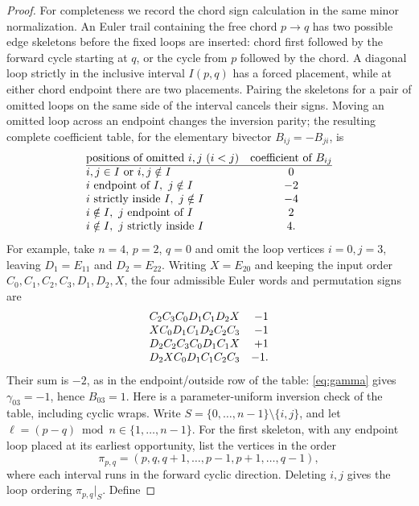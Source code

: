 \begin{proof}
For completeness we record the chord sign calculation in the same
minor normalization. An Euler trail containing the free chord
$p\to q$ has two possible edge skeletons before the fixed loops
are inserted: chord first followed by the forward cycle starting
at $q$, or the cycle from $p$ followed by the chord. A diagonal
loop strictly in the inclusive interval $I(p,q)$ has a forced
placement, while at either chord endpoint there are two placements.
Pairing the skeletons for a pair of omitted loops on the same side
of the interval cancels their signs. Moving an omitted loop
across an endpoint changes the inversion parity; the resulting
complete coefficient table, for the elementary bivector
$B_{ij}=-B_{ji}$, is
\begin{equation}\label{eq:chordsigns}
\begin{array}{@{}lc@{}}
\text{positions of omitted }i,j\ (i<j)&\text{coefficient of }B_{ij}\\\hline
 i,j\in I\text{ or }i,j\notin I&0\\
 i\text{ endpoint of }I,\ j\notin I&-2\\
 i\text{ strictly inside }I,\ j\notin I&-4\\
 i\notin I,\ j\text{ endpoint of }I&2\\
 i\notin I,\ j\text{ strictly inside }I&4.
\end{array}
\end{equation}
For example, take $n=4$, $p=2$, $q=0$ and omit the loop vertices
$i=0,j=3$, leaving $D_1=E_{11}$ and $D_2=E_{22}$.
Writing $X=E_{20}$ and keeping the input order
$C_0,C_1,C_2,C_3,D_1,D_2,X$, the four admissible Euler words and
permutation signs are
\[
\begin{array}{@{}lr@{}}
 C_2C_3C_0D_1C_1D_2X & -1\\
 XC_0D_1C_1D_2C_2C_3 & -1\\
 D_2C_2C_3C_0D_1C_1X & +1\\
 D_2XC_0D_1C_1C_2C_3 & -1.
\end{array}
\]
Their sum is $-2$, as in the endpoint/outside row of the table:
\eqref{eq:gamma} gives $\gamma_{03}=-1$, hence $B_{03}=1$.
Here is a parameter-uniform inversion check of the table, including
cyclic wraps. Write $S=\{0,\ldots,n-1\}\setminus\{i,j\}$, and
let $\ell=(p-q)\bmod n\in\{1,\ldots,n-1\}$. For the first
skeleton, with any endpoint loop placed at its earliest opportunity,
list the vertices in the order
\[
 \pi_{p,q}=(p,q,q+1,\ldots,p-1,p+1,\ldots,q-1),
\]
where each interval runs in the forward cyclic direction. Deleting
$i,j$ gives the loop ordering $\pi_{p,q}|_S$. Define

\end{proof}

